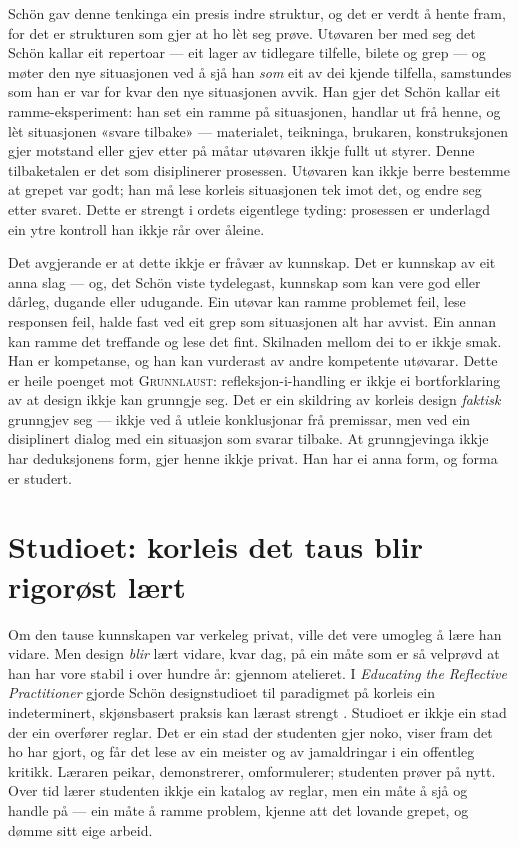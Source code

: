 Schön gav denne tenkinga ein presis indre struktur, og det er verdt å hente fram, for det er strukturen som gjer at ho lèt seg prøve. Utøvaren ber med seg det Schön kallar eit repertoar — eit lager av tidlegare tilfelle, bilete og grep — og møter den nye situasjonen ved å sjå han \emph{som} eit av dei kjende tilfella, samstundes som han er var for kvar den nye situasjonen avvik. Han gjer det Schön kallar eit ramme-eksperiment: han set ein ramme på situasjonen, handlar ut frå henne, og lèt situasjonen «svare tilbake» — materialet, teikninga, brukaren, konstruksjonen gjer motstand eller gjev etter på måtar utøvaren ikkje fullt ut styrer. Denne tilbaketalen er det som disiplinerer prosessen. Utøvaren kan ikkje berre bestemme at grepet var godt; han må lese korleis situasjonen tek imot det, og endre seg etter svaret. Dette er strengt i ordets eigentlege tyding: prosessen er underlagd ein ytre kontroll han ikkje rår over åleine.

Det avgjerande er at dette ikkje er fråvær av kunnskap. Det er kunnskap av eit anna slag — og, det Schön viste tydelegast, kunnskap som kan vere god eller dårleg, dugande eller udugande. Ein utøvar kan ramme problemet feil, lese responsen feil, halde fast ved eit grep som situasjonen alt har avvist. Ein annan kan ramme det treffande og lese det fint. Skilnaden mellom dei to er ikkje smak. Han er kompetanse, og han kan vurderast av andre kompetente utøvarar. Dette er heile poenget mot \textsc{Grunnlaust}: refleksjon-i-handling er ikkje ei bortforklaring av at design ikkje kan grunngje seg. Det er ein skildring av korleis design \emph{faktisk} grunngjev seg — ikkje ved å utleie konklusjonar frå premissar, men ved ein disiplinert dialog med ein situasjon som svarar tilbake. At grunngjevinga ikkje har deduksjonens form, gjer henne ikkje privat. Han har ei anna form, og forma er studert.

\section{Studioet: korleis det taus blir rigorøst lært}

Om den tause kunnskapen var verkeleg privat, ville det vere umogleg å lære han vidare. Men design \emph{blir} lært vidare, kvar dag, på ein måte som er så velprøvd at han har vore stabil i over hundre år: gjennom atelieret. I \emph{Educating the Reflective Practitioner} gjorde Schön designstudioet til paradigmet på korleis ein indeterminert, skjønsbasert praksis kan lærast strengt \autocite{schon1987educating}. Studioet er ikkje ein stad der ein overfører reglar. Det er ein stad der studenten gjer noko, viser fram det ho har gjort, og får det lese av ein meister og av jamaldringar i ein offentleg kritikk. Læraren peikar, demonstrerer, omformulerer; studenten prøver på nytt. Over tid lærer studenten ikkje ein katalog av reglar, men ein måte å sjå og handle på — ein måte å ramme problem, kjenne att det lovande grepet, og dømme sitt eige arbeid.

